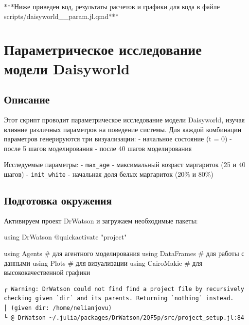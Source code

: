\documentclass[
  12pt,
  a4paper,
  DIV=11,
  numbers=noendperiod]{scrreprt}
\newenvironment{Shaded}{\begin{snugshade}}{\end{snugshade}}
\newcommand{\BuiltInTok}[1]{\textcolor[rgb]{0.00,0.23,0.31}{#1}}
\newcommand{\CommentTok}[1]{\textcolor[rgb]{0.37,0.37,0.37}{#1}}
\newcommand{\ImportTok}[1]{\textcolor[rgb]{0.00,0.46,0.62}{#1}}
\newcommand{\PreprocessorTok}[1]{\textcolor[rgb]{0.68,0.00,0.00}{#1}}
\newcommand{\StringTok}[1]{\textcolor[rgb]{0.13,0.47,0.30}{#1}}
\begin{document}
***Ниже приведен код, результаты расчетов и графики для кода в файле
scripts/daisyworld\_\_param.jl.qmd***

\chapter{Параметрическое исследование модели
Daisyworld}\label{ux43fux430ux440ux430ux43cux435ux442ux440ux438ux447ux435ux441ux43aux43eux435-ux438ux441ux441ux43bux435ux434ux43eux432ux430ux43dux438ux435-ux43cux43eux434ux435ux43bux438-daisyworld}

\section{Описание}\label{ux43eux43fux438ux441ux430ux43dux438ux435-3}

Этот скрипт проводит параметрическое исследование модели Daisyworld,
изучая влияние различных параметров на поведение системы. Для каждой
комбинации параметров генерируются три визуализации: - начальное
состояние (t = 0) - после 5 шагов моделирования - после 40 шагов
моделирования

Исследуемые параметры: - \texttt{max\_age} - максимальный возраст
маргариток (25 и 40 шагов) - \texttt{init\_white} - начальная доля белых
маргариток (20\% и 80\%)

\section{Подготовка
окружения}\label{ux43fux43eux434ux433ux43eux442ux43eux432ux43aux430-ux43eux43aux440ux443ux436ux435ux43dux438ux44f-3}

Активируем проект DrWatson и загружаем необходимые пакеты:

\begin{Shaded}
\begin{Highlighting}[]
\ImportTok{using} \BuiltInTok{DrWatson}
\PreprocessorTok{@quickactivate} \StringTok{"project"}

\ImportTok{using} \BuiltInTok{Agents}      \CommentTok{\# для агентного моделирования}
\ImportTok{using} \BuiltInTok{DataFrames}  \CommentTok{\# для работы с данными}
\ImportTok{using} \BuiltInTok{Plots}       \CommentTok{\# для визуализации}
\ImportTok{using} \BuiltInTok{CairoMakie}  \CommentTok{\# для высококачественной графики}
\end{Highlighting}
\end{Shaded}

\begin{verbatim}
┌ Warning: DrWatson could not find find a project file by recursively checking given `dir` and its parents. Returning `nothing` instead.
│ (given dir: /home/nelianjovu)
└ @ DrWatson ~/.julia/packages/DrWatson/2QF5p/src/project_setup.jl:84
\end{verbatim}
\end{document}
